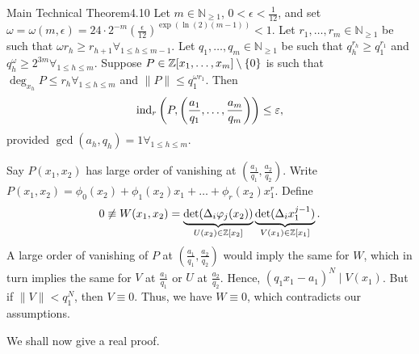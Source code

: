 \documentclass{Vorlesungstemplate_English} %
\renewcommand{\N}{\mathbb{N}_{\geq 1}}
\begin{document}
\begin{theorem}{Main Technical Theorem}{4.10}
  Let $m \in \N$, $0 < \epsilon < \frac{1}{12}$, and set $\omega = \omega(m,\epsilon) = 24\cdot2^{-m}\left(\frac{\epsilon}{12}\right)^{\exp(\ln(2)(m-1))} < 1$. Let $r_1, \dots, r_m \in \N$ be such that $\omega r_h \geq r_{h+1} \forall_{1 \leq h \leq m-1}$. Let $q_1, \dots, q_m \in \N$ be such that $q_h^{r_h} \geq q_1^{r_1}$ and $q_h^{\omega} \geq 2^{3m} \forall_{1 \leq h \leq m}$. Suppose $P \in \mathbb{Z}[x_1, \dots, x_m] \setminus \{ 0\}$ is such that $\deg_{x_h} P \leq r_h \forall_{1 \leq h \leq m}$ and $\| P\| \leq q_1^{\omega r_1}$. Then
  \[ \text{ind}_r\left(P, \left(\frac{a_1}{q_1}, \dots, \frac{a_m}{q_m}\right)\right) \leq \varepsilon,\]
  provided $\gcd(a_h,q_h)=1 \forall_{1 \leq h \leq m}$.
\end{theorem}
\begin{pf}
  Say $P(x_1, x_2)$ has large order of vanishing at $\left(\frac{a_1}{q_1},\frac{a_2}{q_2}\right)$. Write $P(x_1, x_2) = \phi_0(x_2)+\phi_1(x_2)x_1 + \dots + \phi_r(x_2)x_1^r$. Define
  \[ 0 \not\equiv W(x_1,x_2) = \underbrace{\det(\Delta_i\varphi_j(x_2))}_{U(x_2) \in \mathbb{Z}[x_2]}\underbrace{\det(\Delta_ix_1^{j-1})}_{V(x_1) \in \mathbb{Z}[x_1]}.\]
  A large order of vanishing of $P$ at $\left(\frac{a_1}{q_1},\frac{a_2}{q_2}\right)$ would imply the same for $W$, which in turn implies the same for $V$ at $\frac{a_1}{q_1}$ or $U$ at $\frac{a_2}{q_2}$. Hence, $(q_1x_1-a_1)^N \mid V(x_1)$. But if $\|V\| < q_1^N$, then $V \equiv 0$. Thus, we have $W \equiv 0$, which contradicts our assumptions.
\end{pf}
\noindent We shall now give a real proof.
\end{document}
